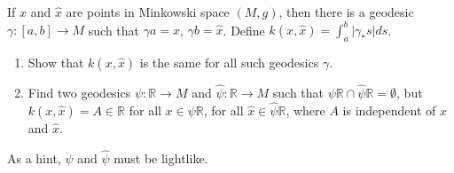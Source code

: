 If $x$ and $\hat{x}$ are points in Minkowski space $(M, g)$, then there is a geodesic $\gamma: [a, b] \rightarrow M$ such that $\gamma a = x$, $\gamma b = \hat{x}$. Define $k(x, \hat{x}) = \int_a^b |\gamma_* s| ds$.
\begin{enumerate}
\item[(a)] Show that $k(x, \hat{x})$ is the same for all such geodesics $\gamma$.
\item[(b)] Find two geodesics $\psi: \mathbb{R} \rightarrow M$ and $\hat{\psi}: \mathbb{R} \rightarrow M$ such that $\psi \mathbb{R} \cap \hat{\psi} \mathbb{R} = \emptyset$, but $k(x, \hat{x}) = A \in \mathbb{R}$ for all $x \in \psi \mathbb{R}$, for all $\hat{x} \in \hat{\psi} \mathbb{R}$, where $A$ is independent of $x$ and $\hat{x}$.
\end{enumerate}
As a hint, $\psi$ and $\hat{\psi}$ must be lightlike.
